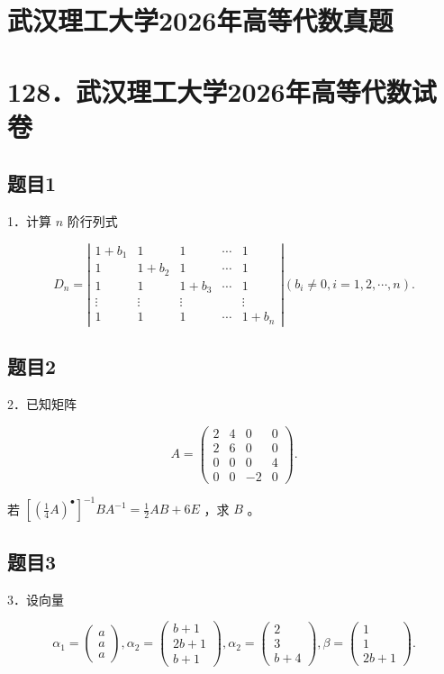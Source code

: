 \documentclass{article}
\begin{document}
\section*{武汉理工大学2026年高等代数真题}
\section*{128．武汉理工大学2026年高等代数试卷}

\subsection{题目1}
1．计算 \(n\) 阶行列式

\[
D_{n}=\left|\begin{array}{ccccc}
1+b_{1} & 1 & 1 & \cdots & 1 \\
1 & 1+b_{2} & 1 & \cdots & 1 \\
1 & 1 & 1+b_{3} & \cdots & 1 \\
\vdots & \vdots & \vdots & & \vdots \\
1 & 1 & 1 & \cdots & 1+b_{n}
\end{array}\right|\left(b_{i} \neq 0, i=1,2, \cdots, n\right) .
\]

\subsection{题目2}
2．已知矩阵

\[
A=\left(\begin{array}{cccc}
2 & 4 & 0 & 0 \\
2 & 6 & 0 & 0 \\
0 & 0 & 0 & 4 \\
0 & 0 & -2 & 0
\end{array}\right) .
\]

若 \(\left[\left(\frac{1}{4} A\right)^{\bullet}\right]^{-1} B A^{-1}=\frac{1}{2} A B+6 E\) ，求 \(B\) 。

\subsection{题目3}
3．设向量

\[
\alpha_{1}=\left(\begin{array}{c}
a \\
a \\
a
\end{array}\right), \alpha_{2}=\left(\begin{array}{c}
b+1 \\
2 b+1 \\
b+1
\end{array}\right), \alpha_{2}=\left(\begin{array}{c}
2 \\
3 \\
b+4
\end{array}\right), \beta=\left(\begin{array}{c}
1 \\
1 \\
2 b+1
\end{array}\right) .
\]
\end{document}
